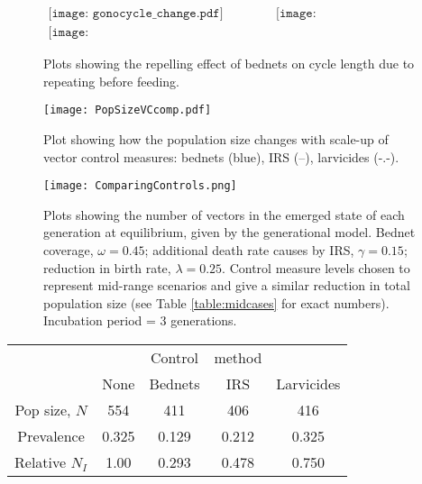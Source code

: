 \documentclass[a4paper,12pt]{article}
\begin{document}
\begin{figure}[h]$
\begin{array}{cc}
\texttt{[image: gonocycle\_change.pdf]}&
\texttt{[image: gonocycle\_days.pdf]}\\
\texttt{[image: incubationperiods\_bednets.pdf]}
\end{array}$
\caption{Plots showing the repelling effect of bednets on cycle length due to repeating before feeding.}
\label{fig:incub}
\end{figure}

\begin{figure}[h]
\texttt{[image: PopSizeVCcomp.pdf]}
\caption{Plot showing how the population size changes with scale-up of vector control measures: bednets (blue), IRS (--), larvicides (-.-).}
\label{fig:popsize}
\end{figure}

\begin{figure}[h]
\texttt{[image: ComparingControls.png]}
\caption{Plots showing the number of vectors in the emerged state of each generation at equilibrium, given by the generational model. Bednet coverage, $\omega=0.45$; additional death rate causes by IRS, $\gamma=0.15$; reduction in birth rate, $\lambda=0.25$. Control measure levels chosen to represent mid-range scenarios and give a similar reduction in total population size (see Table \ref{table:midcases} for exact numbers). Incubation period = 3 generations.}
\label{fig:midcases}
\end{figure}

\begin{table*}[t]
\caption{Population and epidemiological results for the vector control scenarios given in Figure \ref{fig:midcases}. All values given relate to the emerged population only.}%
\vspace{.1cm}
\centering %
\begin{tabular}{|c| c c c c|}%
\hline                    %
 &  & Control & method  & \\

 & None & Bednets & IRS & Larvicides \\ [0.5ex]%
\hline
Pop size, $N$ & 554 & 411 & 406 & 416\\
\hline                  %
Prevalence & 0.325 & 0.129 & 0.212 & 0.325 \\%
\hline
Relative $N_I$ & 1.00 & 0.293 & 0.478 & 0.750 \\
[1ex]      %
\hline%
\end{tabular}
\label{table:midcases}%
\end{table*}
\end{document}
